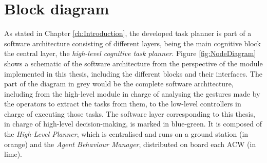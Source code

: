\section{Block diagram}
\label{sec:NodeDiagram}
As stated in Chapter \ref{ch:Introduction}, the developed task planner is part of a software architecture consisting of different layers, being the main cognitive block the central layer, the \emph{high-level cognitive task planner}. Figure \ref{fig:NodeDiagram} shows a schematic of the software architecture from the perspective of the module implemented in this thesis, including the different blocks and their interfaces. The part of the diagram in grey would be the complete software architecture, including from the high-level module in charge of analysing the gestures made by the operators to extract the tasks from them, to the low-level controllers in charge of executing those tasks. The software layer corresponding to this thesis, in charge of high-level decision-making, is marked in blue-green. It is composed of the \emph{High-Level Planner}, which is centralised and runs on a ground station (in orange) and the \emph{Agent Behaviour Manager}, distributed on board each \gls{ACW} (in lime).

